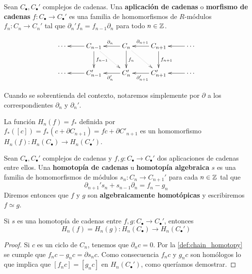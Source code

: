 \begin{definicion}
	Sean \(C_{\bullet},C_{\bullet}'\) complejos de cadenas. Una \textbf{aplicación
		de cadenas} o \textbf{morfismo de cadenas}
	\(f: C_{\bullet}\rightarrow C_{\bullet}'\) es una familia de homomorfismos de
	\(R\)-módulos \(f_{n}: C_{n} \rightarrow C_{n}'\) tal que
	\(\partial_{n}'f_{n} = f_{n-1}\partial_{n}\) para todo \(n \in \mathbb{Z}\).
\end{definicion}

\begin{equation}
	\label{chaincomplex}\xymatrix{ \cdots & C_{n-1} \ar[l] \ar[d]^{f_{n-1}} \ar@{..>}[dr] & C_n \ar[l]_{\partial_{n}} \ar[d]^{f_n} \ar@{..>}[dr] & C_{n+1} \ar[l]_{\partial_{n+1}} \ar[d]^{f_{n+1}} & \cdots \ar[l] \\ \cdots & C'_{n-1} \ar[l] & C'_n \ar[l]^{\partial'_{n}} & C'_{n+1} \ar[l]^{\partial'_{n+1}} & \cdots \ar[l] }
\end{equation}

Cuando se sobrentienda del contexto, notaremos simplemente por \(\partial\) a los
correspondientes \(\partial_{n}\) y \(\partial_{n}'\).

La función \(H_{n}(f) = f_{*}\) definida por
\(f_{*}([c]) = f_{*}(c + \partial C_{n+1}) = fc + \partial C'_{n+1}\) es un
homomorfismo \(H_{n}(f): H_{n}(C_{\bullet}) \rightarrow H_{n}(C_{\bullet}')\).%

\begin{definicion}
	\label{def:chain_homotopy} Sean \(C_{\bullet},C_{\bullet}'\) complejos de cadenas
	y \(f,g: C_{\bullet}\rightarrow C_{\bullet}'\) dos aplicaciones de cadenas entre
	ellos. Una \textbf{homotopía de cadenas} u \textbf{homotopía algebraica} \(s\)
	es una familia de homomorfismos de módulos \(s_{n}: C_{n} \rightarrow C_{n+1}'\)
	para cada \(n \in \mathbb{Z}\) tal que
	\begin{equation}
		\partial_{n+1}'s_{n} + s_{n-1}\partial_{n} = f_{n} - g_{n}
	\end{equation}
	Diremos entonces que \(f\) y \(g\) son \textbf{algebraicamente homotópicas} y escribiremos
	\(f \simeq g\).
\end{definicion}

\begin{teorema}
	\label{teo:homot-cad-misma-homologia} Si \(s\) es una homotopía de cadenas entre
	\(f,g: C_{\bullet}\rightarrow C_{\bullet}'\), entonces
	\[
	H_{n}(f) = H_{n}(g) : H_{n}(C_{\bullet}) \rightarrow H_{n}(C_{\bullet}')
	\]
\end{teorema}
\begin{proof}
	Si \(c\) es un ciclo de \(C_{n}\), tenemos que \(\partial_{n} c = 0\). Por la \autoref{def:chain_homotopy}
	se cumple que \(f_{n}c-g_{n}c = \partial s_{n} c\). Como consecuencia \(f_{n} c\)
	y \(g_{n} c\) son homólogos lo que implica que \([f_{n} c] = [g_{n} c]\) en
	\(H_{n}(C_{\bullet}')\), como queríamos demostrar.
\end{proof}

